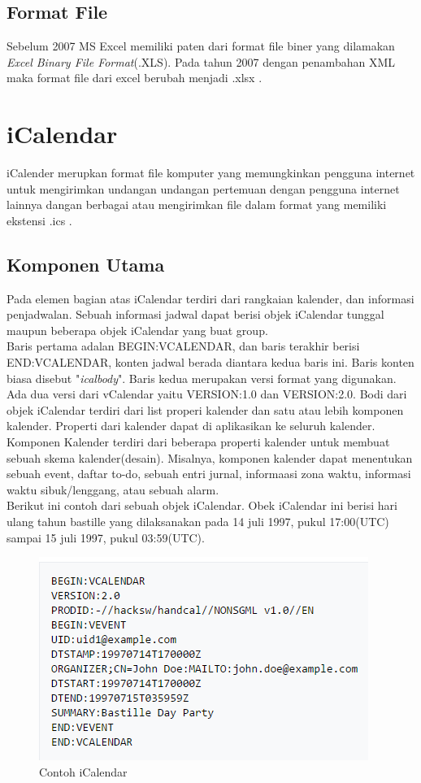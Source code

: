 \subsection{Format File}
 Sebelum 2007 MS Excel memiliki paten dari format file biner yang dilamakan \textit{Excel Binary File Format}(.XLS). Pada tahun 2007 dengan penambahan XML maka format file dari excel berubah menjadi .xlsx . \cite{excel}

\section{iCalendar}
\label{sec:iCalendar}
iCalender merupkan format file komputer yang memungkinkan pengguna internet untuk mengirimkan undangan undangan pertemuan dengan pengguna internet lainnya dangan berbagai atau mengirimkan file dalam format yang memiliki ekstensi .ics .\cite{iCalendar}

\subsection{Komponen Utama}
Pada elemen bagian atas iCalendar terdiri dari rangkaian kalender, dan informasi penjadwalan. Sebuah informasi jadwal dapat berisi objek iCalendar tunggal maupun beberapa objek iCalendar yang buat group.\\
Baris pertama adalan BEGIN:VCALENDAR, dan baris terakhir berisi END:VCALENDAR, konten jadwal berada diantara kedua baris ini. Baris konten biasa disebut "\textit{icalbody}". Baris kedua merupakan versi format yang digunakan. Ada dua versi dari vCalendar yaitu VERSION:1.0 dan VERSION:2.0. Bodi dari objek iCalendar terdiri dari list properi kalender dan satu atau lebih komponen kalender. Properti dari kalender dapat di aplikasikan ke seluruh kalender. Komponen Kalender terdiri dari beberapa properti kalender untuk membuat sebuah skema kalender(desain). Misalnya, komponen kalender dapat menentukan sebuah event, daftar to-do, sebuah entri jurnal, informaasi zona waktu, informasi waktu sibuk/lenggang, atau sebuah alarm. \\
Berikut ini contoh dari sebuah objek iCalendar. Obek iCalendar ini berisi hari ulang tahun bastille yang dilaksanakan pada 14 juli 1997, pukul 17:00(UTC) sampai 15 juli 1997, pukul 03:59(UTC).\cite{iCalendar}
\begin{figure}[H]
	\centering
	\includegraphics[scale=0.5]{Gambar/CaptureiCalendar1}
	\caption{Contoh iCalendar}
\end{figure}

